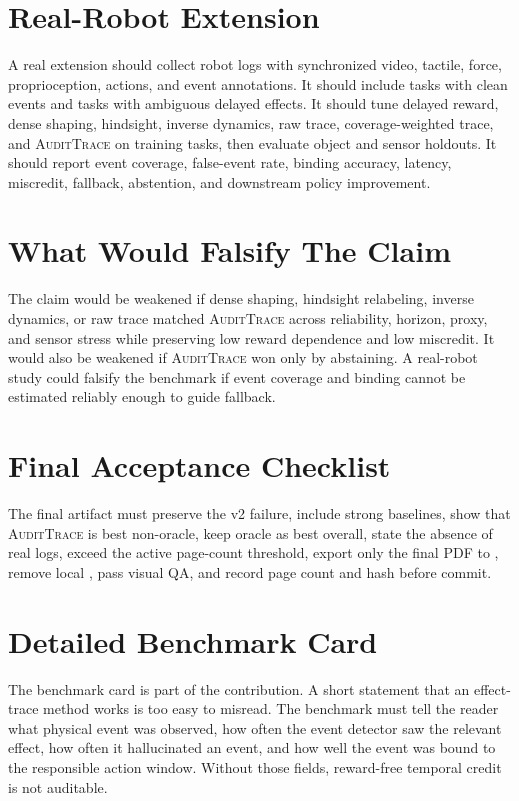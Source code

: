 \documentclass{article}
\newcommand{\method}{\textsc{AuditTrace}\xspace}
\begin{document}
\section{Real-Robot Extension}

A real extension should collect robot logs with synchronized video, tactile, force, proprioception, actions, and event annotations. It should include tasks with clean events and tasks with ambiguous delayed effects. It should tune delayed reward, dense shaping, hindsight, inverse dynamics, raw trace, coverage-weighted trace, and \method on training tasks, then evaluate object and sensor holdouts. It should report event coverage, false-event rate, binding accuracy, latency, miscredit, fallback, abstention, and downstream policy improvement.

\section{What Would Falsify The Claim}

The claim would be weakened if dense shaping, hindsight relabeling, inverse dynamics, or raw trace matched \method across reliability, horizon, proxy, and sensor stress while preserving low reward dependence and low miscredit. It would also be weakened if \method won only by abstaining. A real-robot study could falsify the benchmark if event coverage and binding cannot be estimated reliably enough to guide fallback.

\section{Final Acceptance Checklist}

The final artifact must preserve the v2 failure, include strong baselines, show that \method is best non-oracle, keep oracle as best overall, state the absence of real logs, exceed the active page-count threshold, export only the final PDF to , remove local , pass visual QA, and record page count and hash before commit.

\section{Detailed Benchmark Card}

The benchmark card is part of the contribution. A short statement that an effect-trace method works is too easy to misread. The benchmark must tell the reader what physical event was observed, how often the event detector saw the relevant effect, how often it hallucinated an event, and how well the event was bound to the responsible action window. Without those fields, reward-free temporal credit is not auditable.
\end{document}
